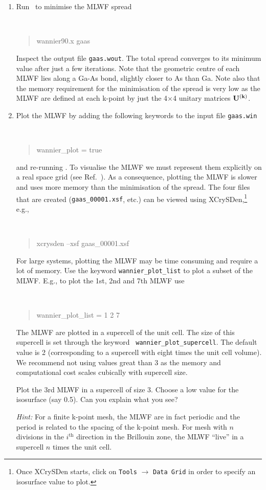 \documentclass[a4paper,11pt,twoside]{article}
\begin{document}
\begin{enumerate}
\item Run \wannier\ to minimise the MLWF spread
{\tt
\begin{quote}
wannier90.x gaas
\end{quote} }
Inspect the output file {\tt gaas.wout}. The total spread converges to its
minimum value after just a few iterations. Note that the geometric centre of
each MLWF lies along a Ga-As bond, slightly closer to As
than Ga. Note also that the memory requirement for the minimisation of
the spread is very low as the MLWF are defined at each
k-point by just the 4$\times$4 unitary matrices $\mathbf{U}^{(\mathbf{k})}$. 
\item Plot the MLWF by adding the following keywords to
  the input file {\tt gaas.win} 
{\tt
\begin{quote}
wannier\_plot = true
\end{quote} }
and re-running \wannier. To visualise the MLWF we must
represent them explicitly on a real space grid (see
Ref.~\cite{UserGuide}). As a consequence, plotting the MLWF is slower
and uses more memory than the minimisation of the spread. The four
files that are created ({\tt gaas\_00001.xsf}, etc.) can be viewed
using XCrySDen,\footnote{Once XCrySDen starts, click on {\tt Tools}
  $\rightarrow$ {\tt Data Grid} in order to specify an isosurface
  value to plot.} e.g.,
{\tt
\begin{quote}
xcrysden --xsf gaas\_00001.xsf
\end{quote} }

For large systems, plotting the MLWF may be time consuming
and require a lot of memory. Use the keyword {\tt wannier\_plot\_list}
to plot a subset of the MLWF. E.g., to plot the
1st, 2nd and 7th MLWF use 
{\tt
\begin{quote}
wannier\_plot\_list = 1 2 7
\end{quote} }
The MLWF are plotted in a supercell of the unit cell. The
size of this supercell is set through the keyword {\tt
  wannier\_plot\_supercell}. The default value is 2 (corresponding to a
supercell with eight times the unit cell volume). We recommend not using
values great than 3 as the memory and computational cost scales
cubically with supercell size.  

Plot the 3rd MLWF in a supercell of size 3. Choose a low
value for the isosurface (say 0.5). Can you explain what you see? 

{\it Hint:} For a finite k-point mesh, the MLWF are in fact
periodic and the period is related to the spacing of the k-point mesh. For
mesh with $n$ divisions in the $i^{\mathrm{th}}$ direction in the
Brillouin zone, the MLWF ``live'' in a supercell $n$ times the
unit cell. 
\end{enumerate}
\end{document}
